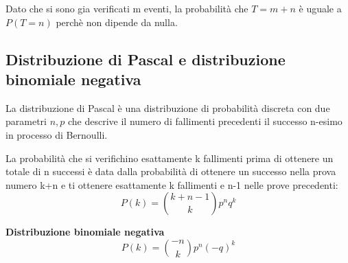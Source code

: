 \documentclass[12pt]{article}
\begin{document}
Dato che si sono gia verificati m eventi, la probabilità che \(T = m+n \) è uguale a \(P(T=n)\) perchè non dipende da nulla. 

\subsection{Distribuzione di Pascal e distribuzione binomiale negativa}

La distribuzione di Pascal è una distribuzione di probabilità discreta con due parametri
\(n,p\) che descrive il numero di fallimenti precedenti il successo n-esimo in processo
di Bernoulli. 

La probabilità che si verifichino esattamente k fallimenti prima di ottenere un totale di n successi
è data dalla probabilità di ottenere un successo nella prova numero k+n e ti ottenere
esattamente k fallimenti e n-1 nelle prove precedenti:
\[
P(k) = \binom{k+n-1}{k} p^nq^k   
\]

\textbf{Distribuzione binomiale negativa} \newline
\[
P(k) = \binom{-n}{k}p^n(-q)^k    
\]
\end{document}
